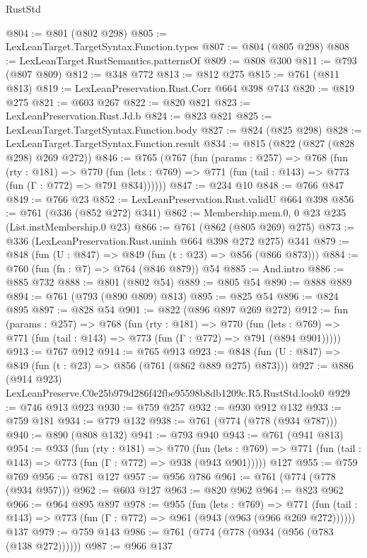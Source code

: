 \begin{lexlean}{RustStd}
\begin{coremodule}
@804 := @801 (@802 @298)
@805 := LexLeanTarget.TargetSyntax.Function.types
@807 := @804 (@805 @298)
@808 := LexLeanTarget.RustSemantics.patternsOf
@809 := @808 @300
@811 := @793 (@807 @809)
@812 := @348 @772
@813 := @812 @275
@815 := @761 (@811 @813)
@819 := LexLeanPreservation.Rust.Corr @664 @398 @743
@820 := @819 @275
@821 := @603 @267
@822 := @820 @821
@823 := LexLeanPreservation.Rust.Jd.b
@824 := @823 @821
@825 := LexLeanTarget.TargetSyntax.Function.body
@827 := @824 (@825 @298)
@828 := LexLeanTarget.TargetSyntax.Function.result
@834 := @815 (@822 (@827 (@828 @298) @269 @272))
@846 := @765
    (@767
      (fun (params : @257) =>
      @768
        (fun (rty : @181) =>
        @770
          (fun (lets : @769) => @771 (fun (tail : @143) => @773 (fun (Γ : @772) => @791 @834))))))
@847 := @234 @10
@848 := @766 @847
@849 := @766 @23
@852 := LexLeanPreservation.Rust.validU @664 @398
@856 := @761 (@336 (@852 @272) @341)
@862 := Membership.mem.{0, 0} @23 @235 (List.instMembership.{0} @23)
@866 := @761 (@862 (@805 @269) @275)
@873 := @336 (LexLeanPreservation.Rust.uninh @664 @398 @272 @275) @341
@879 := @848 (fun (U : @847) => @849 (fun (t : @23) => @856 (@866 @873)))
@884 := @760 (fun (fn : @7) => @764 (@846 @879)) @54
@885 := And.intro
@886 := @885 @732
@888 := @801 (@802 @54)
@889 := @805 @54
@890 := @888 @889
@894 := @761 (@793 (@890 @809) @813)
@895 := @825 @54
@896 := @824 @895
@897 := @828 @54
@901 := @822 (@896 @897 @269 @272)
@912 := fun (params : @257) =>
  @768
    (fun (rty : @181) =>
    @770
      (fun (lets : @769) => @771 (fun (tail : @143) => @773 (fun (Γ : @772) => @791 (@894 @901)))))
@913 := @767 @912
@914 := @765 @913
@923 := @848 (fun (U : @847) => @849 (fun (t : @23) => @856 (@761 (@862 @889 @275) @873)))
@927 := @886 (@914 @923) LexLeanPreserve.C0e25b979d286f42fbe95598b8db1209c.R5.RustStd.look0
@929 := @746 @913 @923
@930 := @759 @257
@932 := @930 @912 @132
@933 := @759 @181
@934 := @779 @132
@938 := @761 (@774 (@778 (@934 @787)))
@940 := @890 (@808 @132)
@941 := @793 @940
@943 := @761 (@941 @813)
@954 := @933
    (fun (rty : @181) =>
    @770
      (fun (lets : @769) => @771 (fun (tail : @143) => @773 (fun (Γ : @772) => @938 (@943 @901)))))
    @127
@955 := @759 @769
@956 := @781 @127
@957 := @956 @786
@961 := @761 (@774 (@778 (@934 @957)))
@962 := @603 @127
@963 := @820 @962
@964 := @823 @962
@966 := @964 @895 @897
@978 := @955
    (fun (lets : @769) =>
    @771 (fun (tail : @143) => @773 (fun (Γ : @772) => @961 (@943 (@963 (@966 @269 @272))))))
    @137
@979 := @759 @143
@986 := @761 (@774 (@778 (@934 (@956 (@783 (@138 @272))))))
@987 := @966 @137

\end{coremodule}
\end{lexlean}
